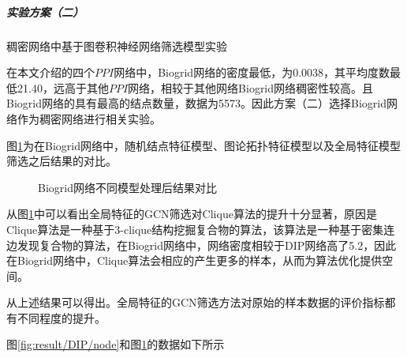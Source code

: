 \subparagraph*{实验方案（二）} 稠密网络中基于图卷积神经网络筛选模型实验

在本文介绍的四个$PPI$网络中，Biogrid网络的密度最低，为0.0038，其平均度数最低21.40，远高于其他$PPI$网络，相较于其他网络Biogrid网络稠密性较高。且Biogrid网络的具有最高的结点数量，数据为5573。因此方案（二）选择Biogrid网络作为稠密网络进行相关实验。

图\ref{fig:result/Biogrid/node}为在Biogrid网络中，随机结点特征模型、图论拓扑特征模型以及全局特征模型筛选之后结果的对比。
\begin{figure}[htbp]
    \centering
    \vskip0.2cm
    \caption{Biogrid网络不同模型处理后结果对比}
    \label{fig:result/Biogrid/node}
\end{figure}

从图\ref{fig:result/Biogrid/node}中可以看出全局特征的GCN筛选对Clique算法的提升十分显著，原因是Clique算法是一种基于3-clique结构挖掘复合物的算法，该算法是一种基于密集连边发现复合物的算法，在Biogrid网络中，网络密度相较于DIP网络高了5.2，因此在Biogrid网络中，Clique算法会相应的产生更多的样本，从而为算法优化提供空间。

从上述结果可以得出。全局特征的GCN筛选方法对原始的样本数据的评价指标都有不同程度的提升。

图\ref{fig:result/DIP/node}和图\ref{fig:result/Biogrid/node}的数据如下所示

